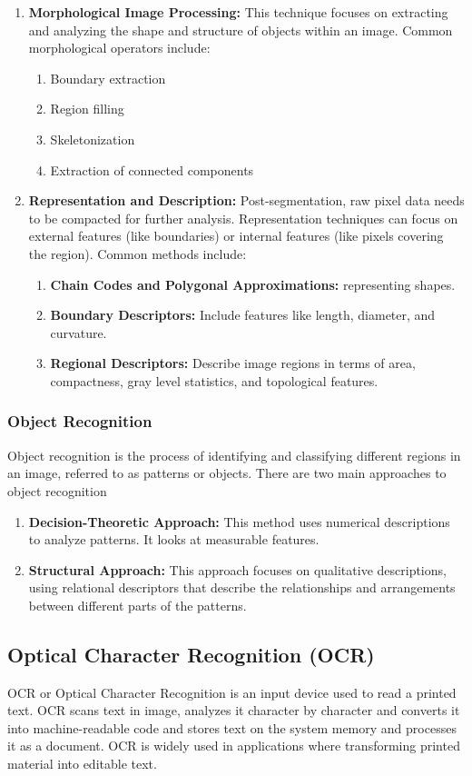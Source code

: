 \documentclass[12pt,oneside,openright,a4paper]{cpe-english-project}
\begin{document}
\begin{enumerate}
	\item \textbf{Morphological Image Processing:} This technique focuses on extracting and analyzing the shape and structure of objects within an image. Common morphological operators include:
	\begin{enumerate}
		\item Boundary extraction
		\item Region filling
		\item Skeletonization
		\item Extraction of connected components
	\end{enumerate}
	\item \textbf{Representation and Description:} Post-segmentation, raw pixel data needs to be compacted for further analysis. Representation techniques can focus on external features (like boundaries) or internal features (like pixels covering the region). Common methods include:
	\begin{enumerate}
		\item \textbf{Chain Codes and Polygonal Approximations:} representing shapes.
		\item \textbf{Boundary Descriptors:} Include features like length, diameter, and curvature.
		\item \textbf{Regional Descriptors:} Describe image regions in terms of area, compactness, gray level statistics, and topological features.
	\end{enumerate}
\end{enumerate}

\subsubsection{Object Recognition} Object recognition is the process of identifying and classifying different regions in an image, referred to as patterns or objects. There are two main approaches to object recognition

\begin{enumerate}
	\item \textbf{Decision-Theoretic Approach:} This method uses numerical descriptions to analyze patterns. It looks at measurable features.
	\item \textbf{Structural Approach:} This approach focuses on qualitative descriptions, using relational descriptors that describe the relationships and arrangements between different parts of the patterns.
\end{enumerate}
 
\subsection{Optical Character Recognition (OCR)} OCR or Optical Character Recognition is an input device used to read a printed text. OCR scans text in image, analyzes it character by character and converts it into machine-readable code and stores text on the system memory and processes it as a document. OCR is widely used in applications where transforming printed material into editable text.
\end{document}
